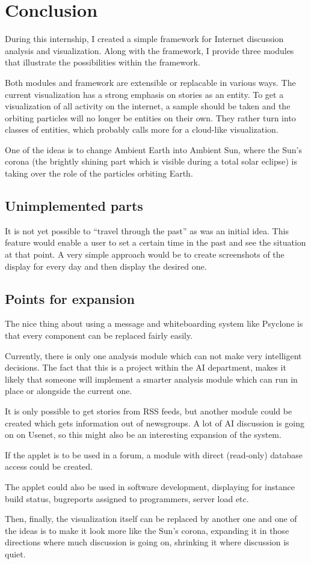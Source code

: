 \chapter{\label{cpt:conclusion}Conclusion}

During this internship, I created a simple framework for Internet discussion
analysis and visualization. Along with the framework, I provide three modules
that illustrate the possibilities within the framework.

Both modules and framework are extensible or replacable in various ways.
The current visualization has a strong emphasis on stories as an entity.
To get a visualization of all activity on the internet, a sample should be
taken and the orbiting particles will no longer be entities on their own.
They rather turn into classes of entities, which probably calls more for a
cloud-like visualization.

One of the ideas is to change Ambient Earth into Ambient Sun, where the
Sun's corona (the brightly shining part which is visible during a total
solar eclipse) is taking over the role of the particles orbiting Earth.

\section{Unimplemented parts}

It is not yet possible to ``travel through the past'' as was an initial
idea. This feature would enable a user to set a certain time in the past
and see the situation at that point. A very simple approach would be to
create screenshots of the display for every day and then display the
desired one.

\section{Points for expansion}

The nice thing about using a message and whiteboarding system like
Psyclone is that every component can be replaced fairly easily.

Currently, there is only one analysis module which can not make very
intelligent decisions. The fact that this is a project within the AI
department, makes it likely that someone will implement a smarter analysis
module which can run in place or alongside the current one.

It is only possible to get stories from RSS feeds, but another module
could be created which gets information out of newsgroups. A lot of
AI discussion is going on on Usenet, so this might also be an interesting
expansion of the system.

If the applet is to be used in a forum, a module with direct (read-only)
database access could be created.

The applet could also be used in software development, displaying for
instance build status, bugreports assigned to programmers, server load
etc.

Then, finally, the visualization itself can be replaced by another one and
one of the ideas is to make it look more like the Sun's corona, expanding
it in those directions where much discussion is going on, shrinking it
where discussion is quiet. 
